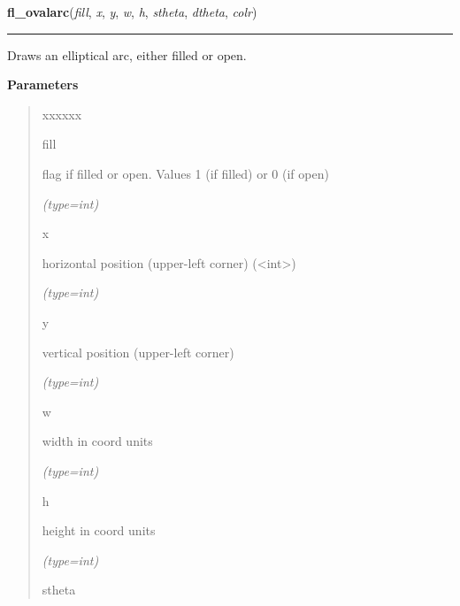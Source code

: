     \label{xformslib:flxbasic:fl_ovalarc}

    \vspace{0.5ex}

\hspace{.8\funcindent}\begin{boxedminipage}{\funcwidth}

    \raggedright \textbf{fl\_ovalarc}(\textit{fill}, \textit{x}, \textit{y}, \textit{w}, \textit{h}, \textit{stheta}, \textit{dtheta}, \textit{colr})

    \vspace{-1.5ex}

    \rule{\textwidth}{0.5\fboxrule}
\setlength{\parskip}{2ex}
    Draws an elliptical arc, either filled or open.

\setlength{\parskip}{1ex}
      \textbf{Parameters}
      \vspace{-1ex}

      \begin{quote}
        \begin{Ventry}{xxxxxx}

          \item[fill]

          flag if filled or open. Values 1 (if filled) or 0 (if open)

            {\it (type=int)}

          \item[x]

          horizontal position (upper-left corner) 
          ({\textless}int{\textgreater})

            {\it (type=int)}

          \item[y]

          vertical position (upper-left corner)

            {\it (type=int)}

          \item[w]

          width in coord units

            {\it (type=int)}

          \item[h]

          height in coord units

            {\it (type=int)}

          \item[stheta]


\end{Ventry}
\end{quote}
\end{boxedminipage}
